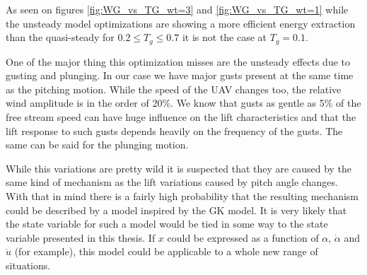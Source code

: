 
\par As seen on figures \ref{fig:WG_vs_TG_wt=3} and \ref{fig:WG_vs_TG_wt=1} while the unsteady model optimizations are showing a more efficient energy extraction than the quasi-steady for $0.2 \leq T_g \leq 0.7$ it is not the case at $T_g=0.1$. 



One of the major thing this optimization misses are the unsteady effects due to gusting and plunging.
In our case we have major gusts present at the same time as the pitching motion.
While the speed of the UAV changes too, the relative wind amplitude is in the order of 20\%.
We know that gusts as gentle as 5\% of the free stream speed can have huge influence on the lift characteristics and that the lift response to such gusts depends heavily on the frequency of the gusts.
The same can be said for the plunging motion.

\par While this variations are pretty wild it is suspected that they are caused by the same kind of mechanism as the lift variations caused by pitch angle changes.
With that in mind there is a fairly high probability that the resulting mechanism could be described by a model inspired by the GK model.
It is very likely that the state variable for such a model would be tied in some way to the state variable presented in this thesis.
If $x$ could be expressed as a function of $\alpha$, $\dot{\alpha}$ and $\dot{u}$ (for example), this model could be applicable to a whole new range of situations.





